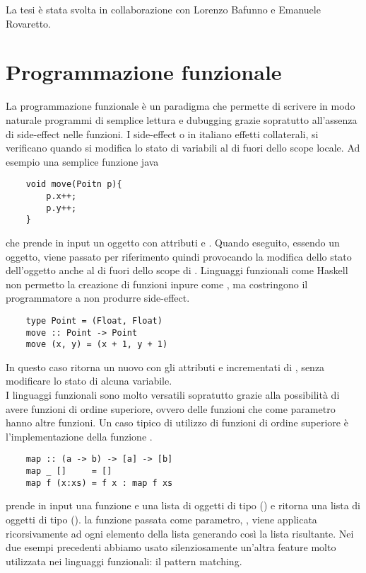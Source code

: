 La tesi è stata svolta in collaborazione con Lorenzo Bafunno e Emanuele Rovaretto.
\section{Programmazione funzionale}
    La programmazione funzionale è un paradigma che permette di scrivere in modo naturale programmi di semplice lettura e dubugging grazie sopratutto all'assenza di side-effect nelle funzioni.
    I side-effect o in italiano effetti collaterali, si verificano quando si modifica lo stato di variabili al di fuori dello scope locale. Ad esempio una semplice funzione java
    \begin{verbatim}
    void move(Poitn p){
        p.x++;
        p.y++;
    }
    \end{verbatim} 
    che prende in input un oggetto  con attributi  e . Quando eseguito, essendo  un oggetto, viene passato per riferimento
    quindi provocando la modifica dello stato dell'oggetto anche al di fuori dello scope di . Linguaggi funzionali come Haskell non
    permetto la creazione di funzioni inpure come , ma costringono il programmatore a non produrre side-effect.
    \begin{verbatim}
    type Point = (Float, Float)
    move :: Point -> Point
    move (x, y) = (x + 1, y + 1)
    \end{verbatim}
    In questo caso  ritorna un nuovo  con gli attributi  e  incrementati di , senza modificare lo stato di alcuna
    variabile.
    \\I linguaggi funzionali sono molto versatili sopratutto grazie alla possibilità di avere funzioni di ordine superiore, ovvero delle funzioni che come parametro
    hanno altre funzioni. Un caso tipico di utilizzo di funzioni di ordine superiore è l'implementazione della funzione .
    \begin{verbatim}
    map :: (a -> b) -> [a] -> [b]
    map _ []     = []
    map f (x:xs) = f x : map f xs
    \end{verbatim}
     prende in input una funzione  e una lista di oggetti di tipo  (\code{[a]}) e ritorna una lista di oggetti di tipo  (\code{[b]}). 
    la funzione passata come parametro, , viene applicata ricorsivamente ad ogni elemento della lista  generando così la lista risultante. 
    Nei due esempi precedenti abbiamo usato silenziosamente un'altra feature molto utilizzata nei linguaggi funzionali: il pattern matching.

